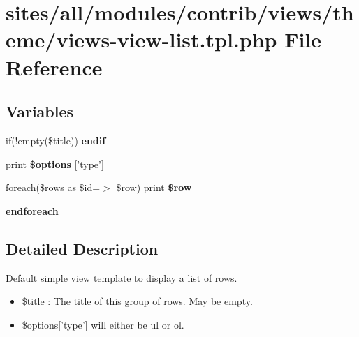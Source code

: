 \hypertarget{views-view-list_8tpl_8php}{
\section{sites/all/modules/contrib/views/theme/views-view-list.tpl.php File Reference}
\label{views-view-list_8tpl_8php}
}
\subsection*{Variables}
\begin{CompactItemize}
\item 
\hypertarget{views-view-list_8tpl_8php_de91bc69a503a5ab88f3fdb968225b63}{
if(!empty(\$title)) \textbf{endif}}
\label{views-view-list_8tpl_8php_de91bc69a503a5ab88f3fdb968225b63}

\item 
\hypertarget{views-view-list_8tpl_8php_b08163648a96cb4dad128d6fe26eff62}{
print \textbf{\$options} \mbox{[}'type'\mbox{]}}
\label{views-view-list_8tpl_8php_b08163648a96cb4dad128d6fe26eff62}

\item 
\hypertarget{views-view-list_8tpl_8php_f50a7f2d493c1886630359887894e53e}{
foreach(\$rows as \$id=$>$ \$row) print \textbf{\$row}}
\label{views-view-list_8tpl_8php_f50a7f2d493c1886630359887894e53e}

\item 
\hypertarget{views-view-list_8tpl_8php_672d9707ef91db026c210f98cc601123}{
\textbf{endforeach}}
\label{views-view-list_8tpl_8php_672d9707ef91db026c210f98cc601123}

\end{CompactItemize}


\subsection{Detailed Description}
Default simple \hyperlink{classview}{view} template to display a list of rows.

\begin{itemize}
\item \$title : The title of this group of rows. May be empty.\item \$options\mbox{[}'type'\mbox{]} will either be ul or ol. \end{itemize}
